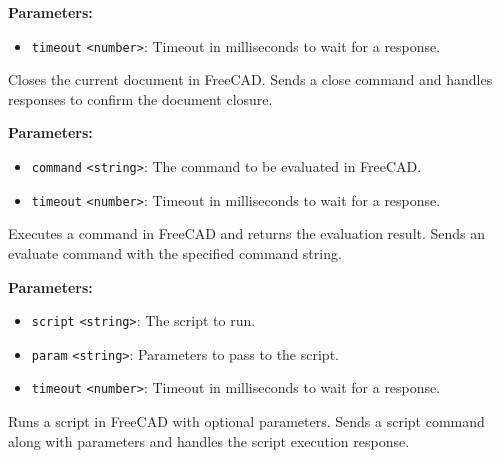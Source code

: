 \documentclass[12pt,a4paper]{article}
\begin{document}
\vspace{5mm}
\noindent {}


\noindent \textbf{Parameters:}
\begin{itemize}
  \item \texttt{timeout} \texttt{<number>}: Timeout in milliseconds to wait for a response.
\end{itemize}

\noindent Closes the current document in FreeCAD.
Sends a close command and handles responses to confirm the document closure.

\vspace{5mm}
\noindent {}


\noindent \textbf{Parameters:}
\begin{itemize}
  \item \texttt{command} \texttt{<string>}: The command to be evaluated in FreeCAD.
  \item \texttt{timeout} \texttt{<number>}: Timeout in milliseconds to wait for a response.
\end{itemize}

\noindent Executes a command in FreeCAD and returns the evaluation result.
Sends an evaluate command with the specified command string.

\vspace{5mm}
\noindent {}


\noindent \textbf{Parameters:}
\begin{itemize}
  \item \texttt{script} \texttt{<string>}: The script to run.
  \item \texttt{param} \texttt{<string>}: Parameters to pass to the script.
  \item \texttt{timeout} \texttt{<number>}: Timeout in milliseconds to wait for a response.
\end{itemize}

\noindent Runs a script in FreeCAD with optional parameters.
Sends a script command along with parameters and handles the script execution response.
\end{document}
